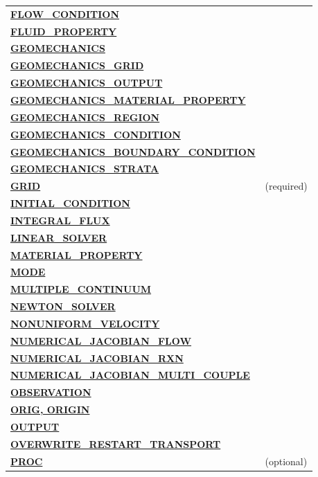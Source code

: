 \begin{longtable}{ll}
\hyperlink{target_flow_cond}{\bf FLOW\_CONDITION} & \\
\hyperlink{target_fluid_property}{\bf FLUID\_PROPERTY} & \\
\hyperlink{target_geomech}{\bf GEOMECHANICS} & \\
\hyperlink{target_geomech_grid}{\bf GEOMECHANICS\_GRID} & \\
\hyperlink{target_geomech_output}{\bf GEOMECHANICS\_OUTPUT} & \\
\hyperlink{target_geomech_material_prop}{\bf GEOMECHANICS\_MATERIAL\_PROPERTY} & \\
\hyperlink{target_geomech_region}{\bf GEOMECHANICS\_REGION} & \\
\hyperlink{target_geomech_condition}{\bf GEOMECHANICS\_CONDITION} & \\
\hyperlink{target_geomech_bc}{\bf GEOMECHANICS\_BOUNDARY\_CONDITION} & \\
\hyperlink{target_geomech_strata}{\bf GEOMECHANICS\_STRATA} & \\
\hyperlink{target_grid}{\bf GRID} & (required)\\
\hyperlink{target_init}{\bf INITIAL\_CONDITION} & \\
\hyperlink{target_int_flux}{\bf INTEGRAL\_FLUX} & \\
\hyperlink{target_linsolv}{\bf LINEAR\_SOLVER} & \\
\hyperlink{target_mat}{\bf MATERIAL\_PROPERTY} & \\
\hyperlink{target_mode}{\bf MODE} & \\
\hyperlink{target_mc}{\bf MULTIPLE\_CONTINUUM} & \\
\hyperlink{target_newt}{\bf NEWTON\_SOLVER} & \\
\hyperlink{target_nonuniform_vel}{\bf NONUNIFORM\_VELOCITY} & \\ 
\hyperlink{target_numjac_flow}{\bf NUMERICAL\_JACOBIAN\_FLOW} & \\
\hyperlink{target_numjac_rxn}{\bf NUMERICAL\_JACOBIAN\_RXN} & \\
\hyperlink{target_numjac_multi}{\bf NUMERICAL\_JACOBIAN\_MULTI\_COUPLE} & \\
\hyperlink{target_observation}{\bf OBSERVATION} & \\
\hyperlink{target_orig}{\bf ORIG, ORIGIN} & \\
\hyperlink{target_output}{\bf OUTPUT} & \\
\hyperlink{target_overwrite}{\bf OVERWRITE\_RESTART\_TRANSPORT} & \\
\hyperlink{target_proc}{\bf PROC} & (optional)\\

\end{longtable}
